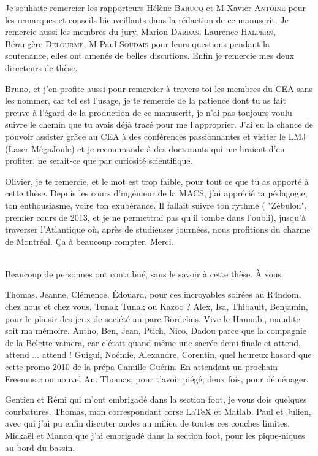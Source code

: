 
Je souhaite remercier les rapporteurs \mme{} Hélène \textsc{Barucq} et M{} Xavier \textsc{Antoine} pour les remarques et conseils bienveillants dans la rédaction de ce manuscrit.
Je remercie aussi les membres du jury, \mme{} Marion \textsc{Darbas}, \mme{} Laurence \textsc{Halpern}, \mme{} Bérangère \textsc{Delourme}, M{} Paul \textsc{Soudais} pour leurs questions pendant la soutenance, elles ont amenés de belles discutions.
Enfin je remercie mes deux directeurs de thèse.

Bruno, et j'en profite aussi pour remercier à travers toi les membres du CEA sans les nommer, car tel est l'usage, je te remercie de la patience dont tu as fait preuve à l'égard de la production de ce manuscrit, je n'ai pas toujours voulu suivre le chemin que tu avais déjà tracé pour me l'approprier.
J'ai eu la chance de pouvoir assister grâce au CEA à des conférences passionnantes et visiter le LMJ (Laser MégaJoule) et je recommande à des doctorants qui me liraient d'en profiter, ne serait-ce que par curiosité scientifique.

Olivier, je te remercie, et le mot est trop faible, pour tout ce que tu as apporté à cette thèse. 
Depuis les cours d'ingénieur de la MACS, j'ai apprécié ta pédagogie, ton enthousiasme, voire ton exubérance. Il fallait suivre ton rythme ( "Zébulon", premier cours de 2013, et je ne permettrai pas qu'il tombe dans l'oubli), jusqu'à traverser l'Atlantique où, après de studieuses journées, nous profitions du charme de Montréal.
 Ça à beaucoup compter. Merci.

~{}\\

Beaucoup de personnes ont contribué, sans le savoir à cette thèse. À vous.

Thomas, Jeanne, Clémence, Édouard, pour ces incroyables soirées au R4ndom, chez nous et chez vous. Tunak Tunak ou Kazoo ? 
Alex, Isa, Thibault, Benjamin, pour le plaisir des jeux de société au parc Bordelais. Vive le Hannabi, maudite soit ma mémoire.
Antho, Ben, Jean, Ptich, Nico, Dadou parce que la compagnie de la Belette vaincra, car c'était quand même une sacrée demi-finale et attend, attend ... attend !
Guigui, Noémie, Alexandre, Corentin, quel heureux hasard que cette promo 2010 de la prépa Camille Guérin. En attendant un prochain Freemusic ou nouvel An.
Thomas, pour t'avoir piégé, deux fois, pour déménager.


Gentien et Rémi qui m'ont embrigadé dans la section foot, je vous dois quelques courbatures. Thomas, mon correspondant corse LaTeX et Matlab. Paul et Julien, avec qui j'ai pu enfin discuter ondes au milieu de toutes ces couches limites.
Mickaël et Manon que j'ai embrigadé dans la section foot, pour les pique-niques au bord du bassin.

